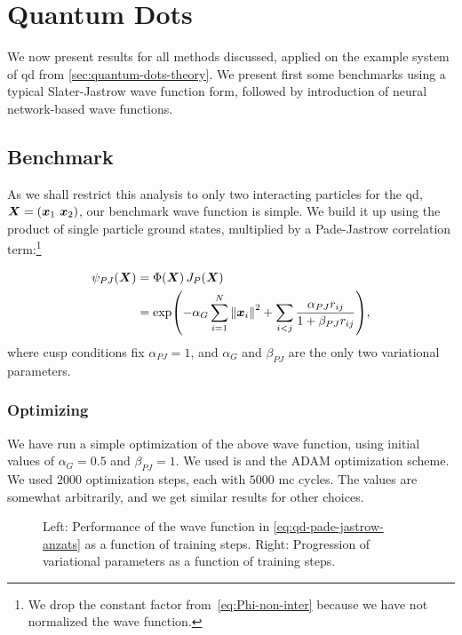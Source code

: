 \documentclass[Thesis.tex]{subfiles}
\begin{document}
\chapter{Quantum Dots}
\label{chp:quantum-dots}

We now present results for all methods discussed, applied on the example system
of \gls{qd} from \cref{sec:quantum-dots-theory}. We present first some
benchmarks using a typical Slater-Jastrow wave function form, followed by
introduction of neural network-based wave functions.

\section{Benchmark}

As we shall restrict this analysis to only two interacting particles for the \gls{qd},
$\bm{X} = (\bm{x}_1\ \bm{x}_2)$, our benchmark wave function is simple. We build
it up using the product of single particle ground states, multiplied
by a Pade-Jastrow correlation term:\footnote{We drop the constant factor from~\cref{eq:Phi-non-inter} because we have not normalized the wave function.}

\begin{align}
  \label{eq:qd-pade-jastrow-anzats}
  \psi_{PJ}(\bm{X}) &= \Phi(\bm{X}) \,J_P(\bm{X})\\
  &= \exp(-\alpha_G\sum_{i=1}^N \norm{\bm{x}_i}^2 + \sum_{i < j} \frac{\alpha_{PJ}
    r_{ij}}{1 + \beta_{PJ} r_{ij}}),
\end{align}
where cusp conditions fix $\alpha_{PJ} = 1$, and $\alpha_G$ and $\beta_{PJ}$
are the only two variational parameters.

\subsection{Optimizing}

We have run a simple optimization of the above wave function, using initial
values of $\alpha_G = 0.5$ and $\beta_{PJ} = 1$. We used \acrlong{is} and the
ADAM optimization scheme. We used $\num{2000}$ optimization steps, each with
$\num{5000}$ \gls{mc} cycles. The values are somewhat arbitrarily, and we get
similar results for other choices.

\begin{figure}[h]
   \centering
    \resizebox{\linewidth}{!}{%
        
    }
    \caption[Learning progression of Pade-Jastrow wave function]{\label{fig:QD-benchmark-pade-jastrow-training}Left: Performance of the
      wave function in \cref{eq:qd-pade-jastrow-anzats} as a function of
      training steps. Right: Progression of variational parameters as a function
      of training steps.}
\end{figure}
\end{document}
